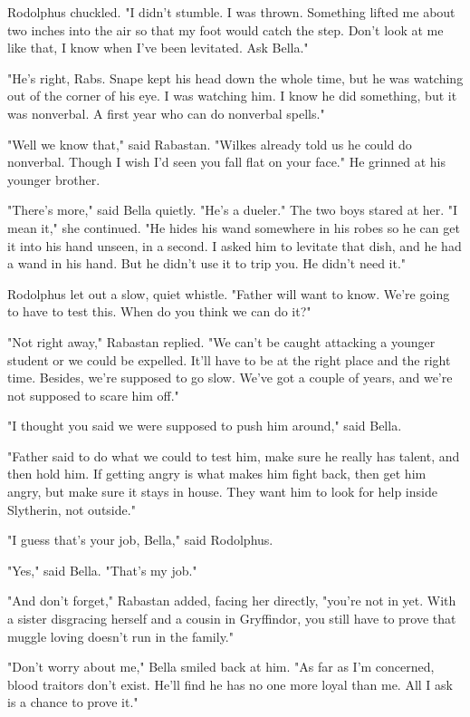 Rodolphus chuckled. "I didn't stumble. I was thrown. Something lifted me about two inches into the air so that my foot would catch the step. Don't look at me like that, I know when I've been levitated. Ask Bella."

"He's right, Rabs. Snape kept his head down the whole time, but he was watching out of the corner of his eye. I was watching him. I know he did something, but it was nonverbal. A first year who can do nonverbal spells."

"Well we know that," said Rabastan. "Wilkes already told us he could do nonverbal. Though I wish I'd seen you fall flat on your face." He grinned at his younger brother.

"There's more," said Bella quietly. "He's a dueler." The two boys stared at her. "I mean it," she continued. "He hides his wand somewhere in his robes so he can get it into his hand unseen, in a second. I asked him to levitate that dish, and he had a wand in his hand. But he didn't use it to trip you. He didn't need it."

Rodolphus let out a slow, quiet whistle. "Father will want to know. We're going to have to test this. When do you think we can do it?"

"Not right away," Rabastan replied. "We can't be caught attacking a younger student or we could be expelled. It'll have to be at the right place and the right time. Besides, we're supposed to go slow. We've got a couple of years, and we're not supposed to scare him off."

"I thought you said we were supposed to push him around," said Bella.

"Father said to do what we could to test him, make sure he really has talent, and then hold him. If getting angry is what makes him fight back, then get him angry, but make sure it stays in house. They want him to look for help inside Slytherin, not outside."

"I guess that's your job, Bella," said Rodolphus.

"Yes," said Bella. "That's my job."

"And don't forget," Rabastan added, facing her directly, "you're not in yet. With a sister disgracing herself and a cousin in Gryffindor, you still have to prove that muggle loving doesn't run in the family."

"Don't worry about me," Bella smiled back at him. "As far as I'm concerned, blood traitors don't exist. He'll find he has no one more loyal than me. All I ask is a chance to prove it."

